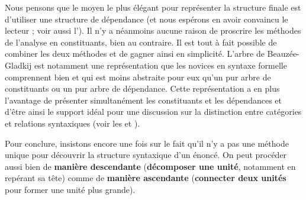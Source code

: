 Nous pensons que le moyen le plus élégant pour représenter la structure finale est d’utiliser une structure de dépendance (et nous espérons en avoir convaincu le lecteur ; voir aussi l’). Il n’y a néanmoins aucune raison de proscrire les méthodes de l’analyse en constituants, bien au contraire. Il est tout à fait possible de combiner les deux méthodes et de gagner ainsi en simplicité. L’arbre de Beauzée-Gladkij est notamment une représentation que les novices en syntaxe formelle comprennent bien et qui est moins abstraite pour eux qu’un pur arbre de constituants ou un pur arbre de dépendance. Cette représentation a en plus l’avantage de présenter simultanément les constituants et les dépendances et d’être ainsi le support idéal pour une discussion sur la distinction entre catégories et relations syntaxiques (voir les  et ).

Pour conclure, insistons encore une fois sur le fait qu’il n’y a pas une méthode unique pour découvrir la structure syntaxique d’un énoncé. On peut procéder aussi bien de \textbf{manière descendante} (\textbf{décomposer une unité}, notamment en repérant sa tête) comme de \textbf{manière ascendante} (\textbf{connecter deux unités} pour former une unité plus grande).

